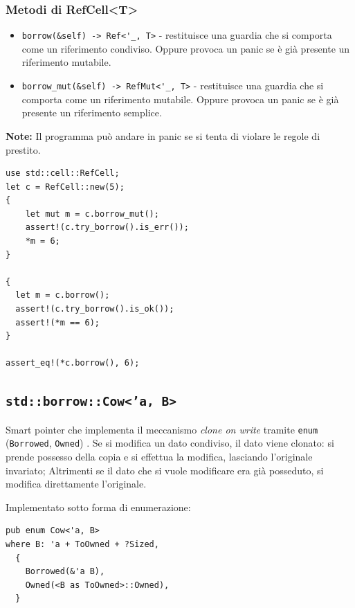 \subsubsection{Metodi di RefCell<T>}

\begin{itemize}
  \item \verb|borrow(&self) -> Ref<'_, T>| - restituisce una guardia che si
        comporta come un riferimento condiviso. Oppure provoca un panic se è già
        presente un riferimento mutabile.
  \item \verb|borrow_mut(&self) -> RefMut<'_, T>| - restituisce una guardia
        che si comporta come un riferimento mutabile. Oppure provoca un panic se è
        già presente un riferimento semplice.
\end{itemize}

\begin{tcolorbox}
  \textbf{Note:} Il programma può andare in panic se si tenta di violare le regole di prestito.
\end{tcolorbox}


\begin{verbatim}
use std::cell::RefCell;
let c = RefCell::new(5);
{
    let mut m = c.borrow_mut();
    assert!(c.try_borrow().is_err());
    *m = 6;
}

{
  let m = c.borrow();
  assert!(c.try_borrow().is_ok());
  assert!(*m == 6);
}

assert_eq!(*c.borrow(), 6);
\end{verbatim}

\subsection{\texttt{std::borrow::Cow<'a, B>}}
Smart pointer che implementa il meccanismo \textit{clone on write} tramite \verb|enum| (\verb|Borrowed|, \verb|Owned|) .
Se si modifica un dato condiviso, il dato viene clonato: si prende possesso
della copia e si effettua la modifica, lasciando l'originale invariato;
Altrimenti se il dato che si vuole modificare era già posseduto,
si modifica direttamente l'originale.


Implementato sotto forma di enumerazione:

\begin{verbatim}
pub enum Cow<'a, B>
where B: 'a + ToOwned + ?Sized,
  {
    Borrowed(&'a B),
    Owned(<B as ToOwned>::Owned),
  }
\end{verbatim}

